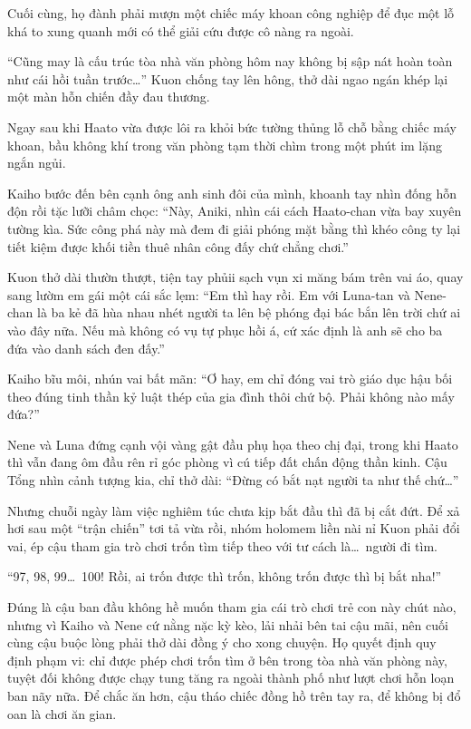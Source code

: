 \documentclass[../main.tex]{subfiles}
\begin{document}
Cuối cùng, họ đành phải mượn một chiếc máy khoan công nghiệp để đục một lỗ khá to xung quanh mới có thể giải cứu được cô nàng ra ngoài.

``Cũng may là cấu trúc tòa nhà văn phòng hôm nay không bị sập nát hoàn toàn như cái hồi tuần trước\dots'' Kuon chống tay lên hông, thở dài ngao ngán khép lại một màn hỗn chiến đầy đau thương.

\omk

Ngay sau khi Haato vừa được lôi ra khỏi bức tường thủng lỗ chỗ bằng chiếc máy khoan, bầu không khí trong văn phòng tạm thời chìm trong một phút im lặng ngắn ngủi.

Kaiho bước đến bên cạnh ông anh sinh đôi của mình, khoanh tay nhìn đống hỗn độn rồi tặc lưỡi châm chọc: ``Này, Aniki, nhìn cái cách Haato-chan vừa bay xuyên tường kìa. Sức công phá này mà đem đi giải phóng mặt bằng thì khéo công ty lại tiết kiệm được khối tiền thuê nhân công đấy chứ chẳng chơi.''

Kuon thở dài thườn thượt, tiện tay phủii sạch vụn xi măng bám trên vai áo, quay sang lườm em gái một cái sắc lẹm: ``Em thì hay rồi. Em với Luna-tan và Nene-chan là ba kẻ đã hùa nhau nhét người ta lên bệ phóng đại bác bắn lên trời chứ ai vào đây nữa. Nếu mà không có vụ tự phục hồi á, cứ xác định là anh sẽ cho ba đứa vào danh sách đen đấy.''

Kaiho bĩu môi, nhún vai bất mãn: ``Ơ hay, em chỉ đóng vai trò giáo dục hậu bối theo đúng tinh thần kỷ luật thép của gia đình thôi chứ bộ. Phải không nào mấy đứa?''

Nene và Luna đứng cạnh vội vàng gật đầu phụ họa theo chị đại, trong khi Haato thì vẫn đang ôm đầu rên rỉ góc phòng vì cú tiếp đất chấn động thần kinh. Cậu Tổng nhìn cảnh tượng kia, chỉ thở dài: ``Đừng có bắt nạt người ta như thế chứ\dots''

\ct

Nhưng chuỗi ngày làm việc nghiêm túc chưa kịp bắt đầu thì đã bị cắt đứt. Để xả hơi sau một ``trận chiến'' tơi tả vừa rồi, nhóm holomem liền nài nỉ Kuon phải đổi vai, ép cậu tham gia trò chơi trốn tìm tiếp theo với tư cách là\dots\ người đi tìm.

``97, 98, 99\dots\ 100! Rồi, ai trốn được thì trốn, không trốn được thì bị bắt nha!''

Đúng là cậu ban đầu không hề muốn tham gia cái trò chơi trẻ con này chút nào, nhưng vì Kaiho và Nene cứ nằng nặc kỳ kèo, lải nhải bên tai cậu mãi, nên cuối cùng cậu buộc lòng phải thở dài đồng ý cho xong chuyện. Họ quyết định quy định phạm vi: chỉ được phép chơi trốn tìm ở bên trong tòa nhà văn phòng này, tuyệt đối không được chạy tung tăng ra ngoài thành phố như lượt chơi hỗn loạn ban nãy nữa. Để chắc ăn hơn, cậu tháo chiếc đồng hồ trên tay ra, để không bị đổ oan là chơi ăn gian.
\end{document}
